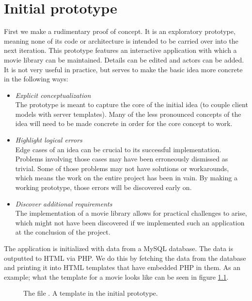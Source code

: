 \chapter{Initial prototype}
First we make a rudimentary proof of concept. It is an exploratory prototype,
meaning none of its code or architecture is intended to be carried over into the
next iteration.
This prototype features an interactive application with which a movie
library can be maintained. Details can be edited and actors can be
added.
It is not very useful in practice, but serves to make the basic idea more
concrete in the following ways:

\begin{itemize}
	\item \emph{Explicit conceptualization}\\
	The prototype is meant to capture the core of the initial idea (to couple
	client models with server templates).
	Many of the less pronounced concepts of the idea will need to be made concrete
	in order for the core concept to work.
	\item \emph{Highlight logical errors}\\
	Edge cases of an idea can be crucial to its successful implementation.
	Problems involving those cases may have been erroneously dismissed as trivial.
	Some of those problems may not have solutions or workarounds, which
	means the work on the entire project has been in vain. By making a working
	prototype, those errors will be discovered early on.
	\item \emph{Discover additional requirements}\\
	The implementation of a movie library allows for practical challenges to
	arise, which might not have been discovered if we implemented such an
	application at the conclusion of the project.
\end{itemize}

The application is initialized with data from a MySQL database. The data is
outputted to HTML via PHP. We do this by fetching the data from the database and
printing it into HTML templates that have embedded PHP in them.
As an example; what the template for a movie looks like can be seen in figure
\ref{fig:movie.view.tpl}.

\begin{figure}
	\label{fig:movie.view.tpl}
	\centering
	
	\caption{
		The file .
		A template in the initial prototype.}
\end{figure}


